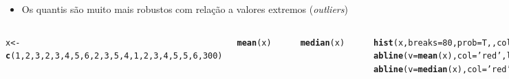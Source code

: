 \documentclass{beamer}\usepackage[]{graphicx}\usepackage[]{color}
\makeatletter
\newcommand{\hlnum}[1]{\textcolor[rgb]{0.686,0.059,0.569}{#1}}%
\newcommand{\hlstr}[1]{\textcolor[rgb]{0.192,0.494,0.8}{#1}}%
\newcommand{\hlstd}[1]{\textcolor[rgb]{0.345,0.345,0.345}{#1}}%
\newcommand{\hlkwb}[1]{\textcolor[rgb]{0.69,0.353,0.396}{#1}}%
\newcommand{\hlkwc}[1]{\textcolor[rgb]{0.333,0.667,0.333}{#1}}%
\newcommand{\hlkwd}[1]{\textcolor[rgb]{0.737,0.353,0.396}{\textbf{#1}}}%
\newenvironment{kframe}{%
 \def\at@end@of@kframe{}%
 \ifinner\ifhmode%
  \def\at@end@of@kframe{\end{minipage}}%
  \begin{minipage}{\columnwidth}%
 \fi\fi%
 \def\FrameCommand##1{\hskip\@totalleftmargin \hskip-\fboxsep
 \colorbox{shadecolor}{##1}\hskip-\fboxsep
     \hskip-\linewidth \hskip-\@totalleftmargin \hskip\columnwidth}%
 \MakeFramed {\advance\hsize-\width
   \@totalleftmargin\z@ \linewidth\hsize
   \@setminipage}}%
 {\par\unskip\endMakeFramed%
 \at@end@of@kframe}
\newenvironment{knitrout}{}{} %
\renewenvironment{knitrout}{\setlength{\topsep}{0mm}}{}
\makeatother
\begin{document}
\begin{frame}[fragile]%

\begin{itemize}
  \item Os quantis são muito mais robustos com relação a valores extremos (\emph{outliers})
\end{itemize}
\begin{columns}[c]


\begin{knitrout}\tiny
{}\color{fgcolor}\begin{kframe}
\begin{alltt}
\hlstd{x} \hlkwb{<-} \hlkwd{c}\hlstd{(}\hlnum{1}\hlstd{,}\hlnum{2}\hlstd{,}\hlnum{3}\hlstd{,}\hlnum{2}\hlstd{,}\hlnum{3}\hlstd{,}\hlnum{4}\hlstd{,}\hlnum{5}\hlstd{,}\hlnum{6}\hlstd{,}\hlnum{2}\hlstd{,}\hlnum{3}\hlstd{,}\hlnum{5}\hlstd{,}\hlnum{4}\hlstd{,}\hlnum{1}\hlstd{,}\hlnum{2}\hlstd{,}\hlnum{3}\hlstd{,}\hlnum{4}\hlstd{,}\hlnum{5}\hlstd{,}\hlnum{5}\hlstd{,}\hlnum{6}\hlstd{,}\hlnum{300}\hlstd{)}

\hlkwd{mean}\hlstd{(x)}
\end{alltt}
\begin{verbatim}
## [1] 18.3
\end{verbatim}
\begin{alltt}
\hlkwd{median}\hlstd{(x)}
\end{alltt}
\begin{verbatim}
## [1] 3.5
\end{verbatim}
\begin{alltt}
\hlkwd{hist}\hlstd{(x,}\hlkwc{breaks}\hlstd{=}\hlnum{80}\hlstd{,}\hlkwc{prob}\hlstd{=T,,}\hlkwc{col}\hlstd{=}\hlstr{'gray70'}\hlstd{)}
\hlkwd{abline}\hlstd{(}\hlkwc{v}\hlstd{=}\hlkwd{mean}\hlstd{(x),}\hlkwc{col}\hlstd{=}\hlstr{'red'}\hlstd{,}\hlkwc{lwd}\hlstd{=}\hlnum{2}\hlstd{,}\hlkwc{lty}\hlstd{=}\hlnum{1}\hlstd{)}
\hlkwd{abline}\hlstd{(}\hlkwc{v}\hlstd{=}\hlkwd{median}\hlstd{(x),}\hlkwc{col}\hlstd{=}\hlstr{'red'}\hlstd{,}\hlkwc{lwd}\hlstd{=}\hlnum{2}\hlstd{,}\hlkwc{lty}\hlstd{=}\hlnum{2}\hlstd{)}
\end{alltt}
\end{kframe}
\end{knitrout}


\end{columns}
\end{frame}
\end{document}
